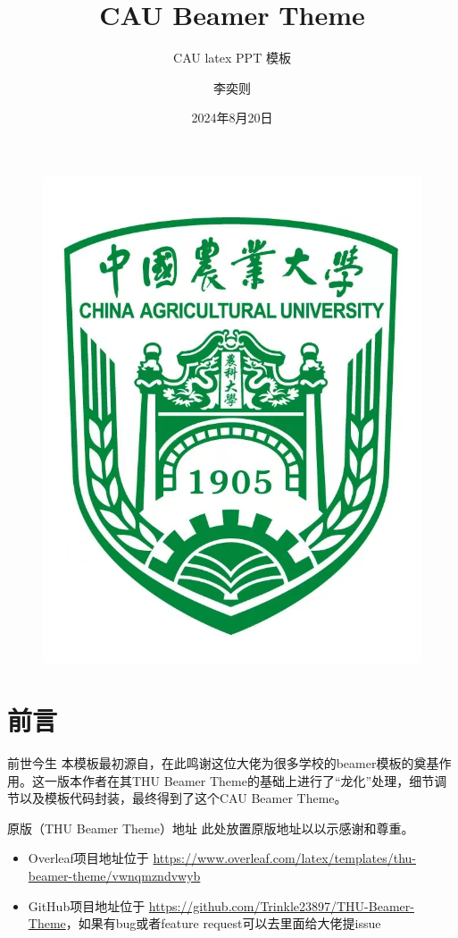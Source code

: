 \documentclass{CAUBeamer}
\author{李奕则}
\title{CAU Beamer Theme}
\subtitle{CAU latex PPT 模板}
\institute{数学与应用数学}
\date{2024年8月20日}
\begin{document}
\kaishu

\begin{frame}
    \titlepage
    \begin{figure}[htpb]
        \begin{center}
            \includegraphics[width=0.15\linewidth]{pic/cau.jpg}
        \end{center}
    \end{figure}
\end{frame}

\begin{frame}
    \tableofcontents[sectionstyle=show,subsectionstyle=show/shaded/hide,subsubsectionstyle=show/shaded/hide]
\end{frame}

\section{前言}

\begin{frame}{前世今生}
    \qquad 本模板最初源自，在此鸣谢这位大佬为很多学校的beamer模板\cite{origin}的奠基作用。这一版本作者在其THU Beamer Theme的基础上进行了“龙化”处理，细节调节以及模板代码封装，最终得到了这个CAU Beamer Theme。
    \par
    \begin{center}
        \large {}
    \end{center} 
\end{frame}

\begin{frame}{原版（THU Beamer Theme）地址}
    此处放置原版地址以以示感谢和尊重。
    \begin{itemize}
        \item  Overleaf项目地址位于 \url{https://www.overleaf.com/latex/templates/thu-beamer-theme/vwnqmzndvwyb}
        \item GitHub项目地址位于 \url{https://github.com/Trinkle23897/THU-Beamer-Theme}，如果有bug或者feature request可以去里面给大佬提issue
    \end{itemize}
\end{frame}
\end{document}
